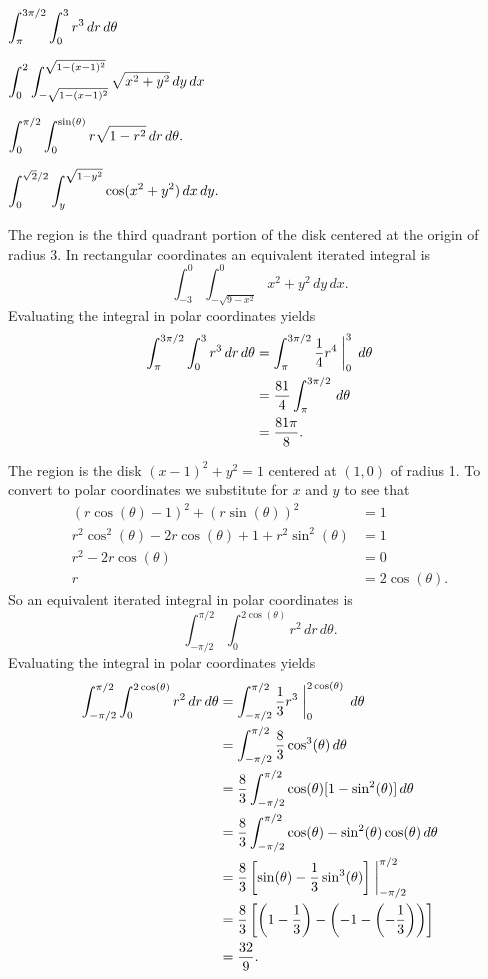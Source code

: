 \begin{exercises}
\ba
	\item $\displaystyle \int_{\pi}^{3\pi/2} \int_{0}^{3}  r^3 \, dr \, d\theta$
	\item $\displaystyle \int_{0}^{2} \int_{-\sqrt{1-(x-1)^2}}^{\sqrt{1-(x-1)^2}} \sqrt{x^2 + y^2} \, dy \, dx$ 
	\item $\displaystyle \int_0^{\pi/2} \int_0^{\sin(\theta)} r \sqrt{1-r^2} \, dr \, d\theta.$
	\item $\displaystyle \int_0^{\sqrt{2}/2} \int_y^{\sqrt{1-y^2}} \cos(x^2 + y^2) \, dx \, dy.$
\ea

\begin{exerciseSolution}
\ba
	\item The region is the third quadrant portion of the disk centered at the origin of radius 3. In rectangular coordinates an equivalent iterated integral is 
\[\int_{-3}^0 \int_{-\sqrt{9-x^2}}^0 x^2+y^2 \, dy \, dx.\]
Evaluating the integral in polar coordinates yields
\begin{align*}
\int_{\pi}^{3\pi/2} \int_{0}^{3}  r^3 \, dr \, d\theta &= \int_{\pi}^{3\pi/2} \frac{1}{4}r^4\biggm|_{0}^{3} \, d\theta \\
	&=  \frac{81}{4} \int_{\pi}^{3\pi/2} \, d\theta \\
	&=  \frac{81 \pi}{8}.
\end{align*}

	\item The region is the disk $(x-1)^2+y^2=1$ centered at $(1,0)$ of radius 1. To convert to polar coordinates we substitute for $x$ and $y$ to see that 
\begin{align*}
(r \cos(\theta)-1)^2 + (r \sin(\theta))^2 &=  1 \\
r^2\cos^2(\theta) -2r\cos(\theta) + 1 + r^2\sin^2(\theta) &=  1 \\
r^2 - 2r\cos(\theta) &= 0 \\
r &= 2\cos(\theta).
\end{align*}
So an equivalent iterated integral in polar coordinates is 
\[\int_{-\pi/2}^{\pi/2} \int_0^{2 \cos(\theta)} r^2 \, dr \, d\theta.\]
Evaluating the integral in polar coordinates yields
\begin{align*}
\int_{-\pi/2}^{\pi/2} \int_{0}^{2\cos(\theta)}  r^2 \, dr \, d\theta &= \int_{-\pi/2}^{\pi/2} \frac{1}{3}r^3\biggm|_{0}^{2\cos(\theta)} \, d\theta \\
	&=  \int_{-\pi/2}^{\pi/2} \frac{8}{3}\cos^3(\theta) \, d\theta \\
	&=  \frac{8}{3}\int_{-\pi/2}^{\pi/2} \cos(\theta)[1-\sin^2(\theta)] \, d\theta \\
	&=  \frac{8}{3}\int_{-\pi/2}^{\pi/2} \cos(\theta)-\sin^2(\theta)\cos(\theta) \, d\theta \\
	&=  \frac{8}{3} \left[\sin(\theta)-\frac{1}{3}\sin^3(\theta) \right]\biggm|_{-\pi/2}^{\pi/2} \\
	&=  \frac{8}{3} \left[\left(1-\frac{1}{3} \right) - \left(-1 - \left(-\frac{1}{3}\right) \right)\right] \\
	&=  \frac{32}{9}.
\end{align*}


\end{exerciseSolution}
\end{exercises}
